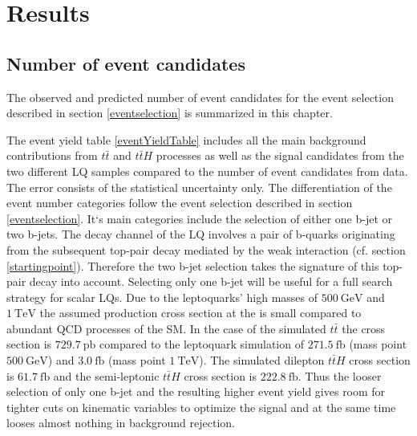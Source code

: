 \chapter{Results}\label{results}
\section{Number of event candidates}\label{eventYield}
The observed and predicted number of event candidates for the event selection described in section \ref{eventselection} is summarized in this chapter.\par
The event yield table \ref{eventYieldTable} includes all the main background contributions from $t\bar{t}$ and $t\bar{t}H$ processes as well as the signal candidates from the two different LQ samples compared to the number of event candidates from data. The error consists of the statistical uncertainty only. The differentiation of the event number categories follow the event selection described in section \ref{eventselection}. It`s main categories include the selection of either one b-jet or two b-jets. The decay channel of the LQ involves a pair of b-quarks originating from the subsequent top-pair decay mediated by the weak interaction (cf. section \ref{startingpoint}). Therefore the two b-jet selection takes the signature of this top-pair decay into account. Selecting only one b-jet will be useful for a full search strategy for scalar LQs. Due to the leptoquarks' high masses of $\SI{500}{\giga\electronvolt}$ and $\SI{1}{\tera\electronvolt}$ the assumed production cross section at the {\LHC} is small compared to abundant QCD processes of the SM. In the case of the simulated $t\bar{t}$ the cross section is $\SI{729.7}{\pico\barn}$ compared to the leptoquark simulation of $\SI{271.5}{\femto\barn}$ (mass point $\SI{500}{\giga\electronvolt}$) and $\SI{3.0}{\femto\barn}$ (mass point $\SI{1}{\tera\electronvolt}$). The simulated dilepton $t\bar{t}H$ cross section is $\SI{61.7}{\femto\barn}$ and the semi-leptonic $t\bar{t}H$ cross section is $\SI{222.8}{\femto\barn}$. Thus the looser selection of only one b-jet and the resulting higher event yield gives room for tighter cuts on kinematic variables to optimize the signal and at the same time looses almost nothing in background rejection. \newline
%
